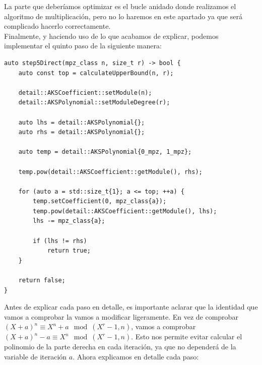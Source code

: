 La parte que deberíamos optimizar es el bucle anidado donde realizamos el algoritmo de multiplicación, pero no lo haremos en este apartado ya que será complicado hacerlo correctamente.\\

Finalmente, y haciendo uso de lo que acabamos de explicar, podemos implementar el quinto paso de la siguiente manera:\\

\begin{lstlisting}
auto step5Direct(mpz_class n, size_t r) -> bool {
	auto const top = calculateUpperBound(n, r);
	
	detail::AKSCoefficient::setModule(n);
	detail::AKSPolynomial::setModuleDegree(r);
	
	auto lhs = detail::AKSPolynomial{};
	auto rhs = detail::AKSPolynomial{};
	
	auto temp = detail::AKSPolynomial{0_mpz, 1_mpz};
	
	temp.pow(detail::AKSCoefficient::getModule(), rhs);
	
	for (auto a = std::size_t{1}; a <= top; ++a) {
		temp.setCoefficient(0, mpz_class{a});
		temp.pow(detail::AKSCoefficient::getModule(), lhs);
		lhs -= mpz_class{a};
		
		if (lhs != rhs)
			return true;
	}
	
	return false;
}
\end{lstlisting}

Antes de explicar cada paso en detalle, es importante aclarar que la identidad que vamos a comprobar la vamos a modificar ligeramente. En vez de comprobar $(X + a)^n \equiv X^n + a \mod(X^r - 1, n)$, vamos a comprobar $(X + a)^n - a \equiv X^n \mod(X^r - 1, n)$. Esto nos permite evitar calcular el polinomio de la parte derecha en cada iteración, ya que no dependerá de la variable de iteración $a$. Ahora explicamos en detalle cada paso:

